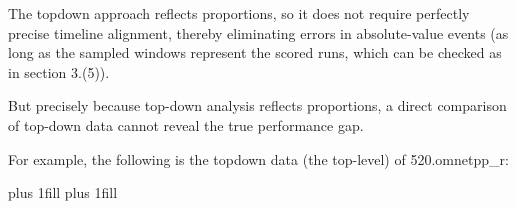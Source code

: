 \documentclass[12pt]{article}
\newcommand\tablefont{\normalfont}}}}
\newcommand{\ipar}[2]{{\leftskip=#1\relax #2\par}}
\begin{document}
\ipar{18.00pt}{\hspace*{4\fontdimen2\font}The topdown approach reflects proportions, so it does not require perfectly precise timeline alignment, thereby eliminating errors in absolute-value events (as long as the sampled windows represent the scored runs, which can be checked as in section 3.(5)).}
\ipar{18.00pt}{\hspace*{4\fontdimen2\font}But precisely because top-down analysis reflects proportions, a direct comparison of top-down data cannot reveal the true performance gap.}
\ipar{18.00pt}{\hspace*{4\fontdimen2\font}For example, the following is the topdown data (the top-level) of 520.omnetpp\_r:}
\par\begingroup\tablefont\fontsize{8pt}{9.76pt}\selectfont\setlength{\tabcolsep}{3.61pt}\LTleft=0pt plus 1fill \LTright=0pt plus 1fill\setlength{\LTpre}{0pt}\setlength{\LTpost}{0pt}
\end{document}
